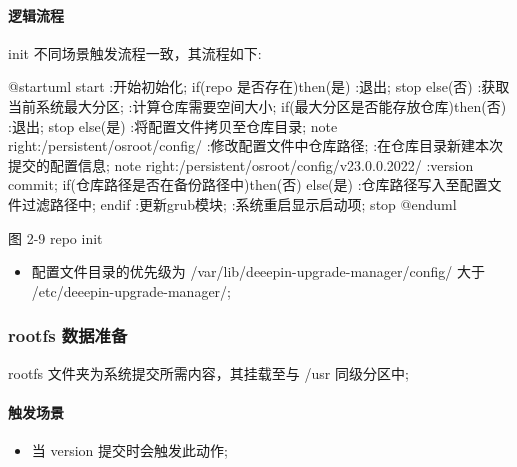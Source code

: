 \documentclass{utart}
\begin{document}
\paragraph{逻辑流程}
init 不同场景触发流程一致，其流程如下:
\begin{center}
  \begin{adjustbox}{scale=0.65}
    \begin{plantuml}
      @startuml
      start
      :开始初始化;
      if(repo 是否存在)then(是)
      :退出;
      stop
      else(否)
      :获取当前系统最大分区;
      :计算仓库需要空间大小;
      if(最大分区是否能存放仓库)then(否)
      :退出;
      stop
      else(是)
      :将配置文件拷贝至仓库目录;
      note right:/persistent/osroot/config/
      :修改配置文件中仓库路径;
      :在仓库目录新建本次提交的配置信息;
      note right:/persistent/osroot/config/v23.0.0.2022/
      :version commit;
      if(仓库路径是否在备份路径中)then(否)
      else(是)
      :仓库路径写入至配置文件过滤路径中;
      endif
      :更新grub模块;
      :系统重启显示启动项;
      stop
      @enduml
    \end{plantuml}
  \end{adjustbox}

  图 2-9 repo init
\end{center}
\begin{itemize}[leftmargin=4em]
  \item 配置文件目录的优先级为 /var/lib/deeepin-upgrade-manager/config/ 大于 /etc/deeepin-upgrade-manager/;
\end{itemize}

\subsubsection{rootfs 数据准备}
rootfs 文件夹为系统提交所需内容，其挂载至与 /usr 同级分区中;
\paragraph{触发场景}
\begin{itemize}[leftmargin=4em]
  \item 当 version 提交时会触发此动作;
\end{itemize}
\end{document}

